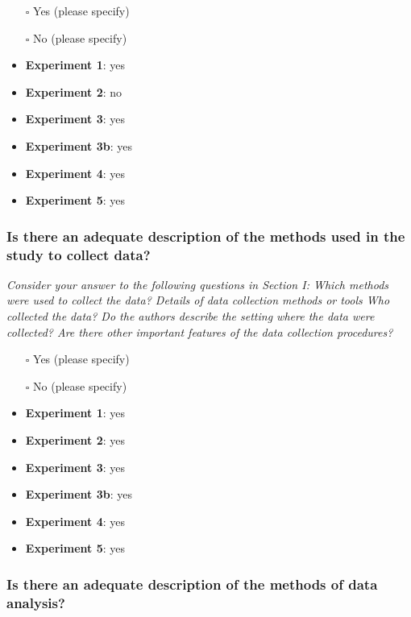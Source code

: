 \documentclass[
  doc, a4paper]{apa7}
\begin{document}
\begin{itemize}
\item[$\square$]
  Yes (please specify)
\item[$\square$]
  No (please specify)
\item
  \textbf{Experiment 1}: yes
\item
  \textbf{Experiment 2}: no
\item
  \textbf{Experiment 3}: yes
\item
  \textbf{Experiment 3b}: yes
\item
  \textbf{Experiment 4}: yes
\item
  \textbf{Experiment 5}: yes
\end{itemize}

\subsubsection{Is there an adequate description of the methods used in the study to collect data?}\label{is-there-an-adequate-description-of-the-methods-used-in-the-study-to-collect-data}

\emph{Consider your answer to the following questions in Section I: Which methods were used to collect the data? Details of data collection methods or tools Who collected the data? Do the authors describe the setting where the data were collected? Are there other important features of the data collection procedures?}

\begin{itemize}
\item[$\square$]
  Yes (please specify)
\item[$\square$]
  No (please specify)
\item
  \textbf{Experiment 1}: yes
\item
  \textbf{Experiment 2}: yes
\item
  \textbf{Experiment 3}: yes
\item
  \textbf{Experiment 3b}: yes
\item
  \textbf{Experiment 4}: yes
\item
  \textbf{Experiment 5}: yes
\end{itemize}

\subsubsection{Is there an adequate description of the methods of data analysis?}\label{is-there-an-adequate-description-of-the-methods-of-data-analysis}
\end{document}
